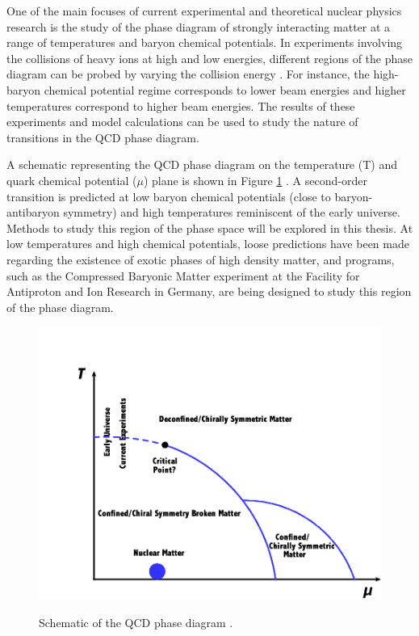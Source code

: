One of the main focuses of current experimental and theoretical nuclear physics research is the study of the phase diagram of strongly interacting matter at a range of temperatures and baryon chemical potentials. In experiments involving the collisions of heavy ions at high and low energies, different regions of the phase diagram can be probed by varying the collision energy \cite{PhysRevC.93.024901}. For instance, the high-baryon chemical potential regime corresponds to lower beam energies and higher temperatures correspond to higher beam energies. The results of these experiments and model calculations can be used to study the nature of transitions in the QCD phase diagram.

A schematic representing the QCD phase diagram on the temperature (T) and quark chemical potential ($\mu$) plane is shown in Figure \ref{fig:PhaseDiagram} \cite{1742-6596-761-1-012066}. A second-order transition is predicted at low baryon chemical potentials (close to baryon-antibaryon symmetry) and high temperatures reminiscent of the early universe. Methods to study this region of the phase space will be explored in this thesis. At low temperatures and high chemical potentials, loose predictions have been made regarding the existence of exotic phases of high density matter, and programs, such as the Compressed Baryonic Matter experiment at the Facility for Antiproton and Ion Research in Germany, are being designed to study this region of the phase diagram.
\begin{figure}[h]
  \centering
  \includegraphics[width=5.5in]{figures/1742-6596-761-1-012066.png}\\
  \caption{Schematic of the QCD phase diagram \cite{1742-6596-761-1-012066}.}\label{fig:PhaseDiagram}
\end{figure}


